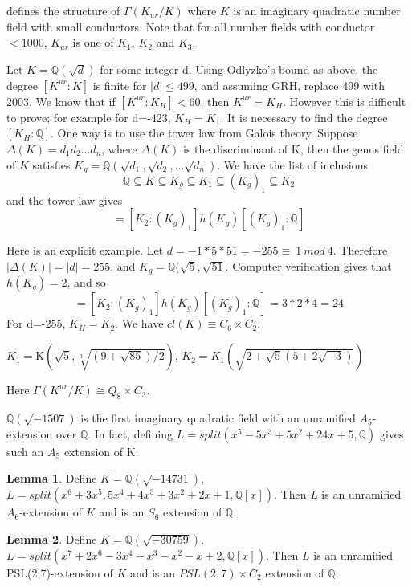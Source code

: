 \documentclass[12pt]{extarticle}
\newcommand{\murgg}{\Gamma(K^{ur}/K)}
\newcommand{\Q}{\mathbb{Q}}
\newcommand{\<}{\langle}
\renewcommand{\>}{\rangle}
\theoremstyle{definition}
\newtheorem{lemma}{Lemma}
\begin{document}
\cite{YAMA1997} defines the structure of $\Gamma(K_{ur}/K)$ where $K$ is an imaginary quadratic number field with small conductors. Note that for all number fields with conductor $<1000$, $K_{ur}$ is one of $K_1$, $K_2$ and $K_3$. \par 
Let $K=\Q(\sqrt{d})$ for some integer d. Using Odlyzko's bound as above, the degree $[K^{ur}:K]$ is finite for $|d|\leq 499$, and assuming GRH, replace 499 with 2003. We know that if $[K^{ur}:K_H]<60$, then $K^{ur}=K_H$. However this is difficult to prove; for example for d=-423, $K_H=K_1$. It is necessary to find the degree $[K_H:\Q]$. One way is to use the tower law from Galois theory. Suppose $\Delta(K)=d_1d_2...d_n$, where $\Delta(K)$ is the discriminant of K, then the genus field of $K$ satisfies $K_g=\Q(\sqrt{d_1},\sqrt{d_2},...\sqrt{d_n})$. We have the list of inclusions \begin{equation}
    \Q \subseteq K \subseteq K_g \subseteq K_1 \subseteq (K_g)_1 \subseteq K_2
\end{equation} and the tower law gives \begin{equation}
    [K_2:q] = [K_2:(K_g)_1]h(K_g)[(K_g)_1:\Q]
\end{equation}\par
Here is an explicit example. Let  $d=-1*5*51=-255\equiv \: 1\:mod\:4$. Therefore $|\Delta(K)|=|d|=255$, and $K_g = \Q(\sqrt{5},\sqrt{51}$. Computer verification gives that $h(K_g)=2$, and so \begin{equation}
     [K_2:\Q] = [K_2:(K_g)_1]h(K_g)[(K_g)_1:\Q]= 3*2*4=24
\end{equation}
For d=-255, $K_H=K_2$. We have $cl(K)\equiv C_6 \times C_2$, 

$K_1 = $K$ \left( 
\sqrt{5}, \sqrt[3]{(9+\sqrt{85})/2}
\right)$, $K_2 = K_1 \left( 
\sqrt{2+\sqrt{5}(5+2\sqrt{-3})}
\right)$

 Here $\murgg \cong Q_8 \times C_3$.
\par
$\mathbb{Q}(\sqrt{-1507})$ is the first imaginary quadratic field with an unramified $A_5$-extension over $\mathbb{Q}$. In fact, defining $L=split\left( x^5-5x^3+5x^2+24x+5,\Q\right)$ gives such an $A_5$ extension of K. 
\begin{lemma}
Define $K=\mathbb{Q}(\sqrt{-14731})$, $L=split(x^6+3x^5,5x^4+4x^3+3x^2+2x+1,\mathbb{Q}[x])$. Then $L$ is an unramified $A_6$-extension of $K$ and is an $S_6$ extension of $\mathbb{Q}$.
\end{lemma}
\begin{lemma}
Define $K=\mathbb{Q}(\sqrt{-30759})$, $L=split(x^7+2x^6-3x^4-x^3-x^2-x+2,\mathbb{Q}[x])$. Then $L$ is an unramified PSL(2,7)-extension of $K$ and is an $PSL(2,7)\times C_2$ extension of $\mathbb{Q}$.
\end{lemma}
\end{document}
